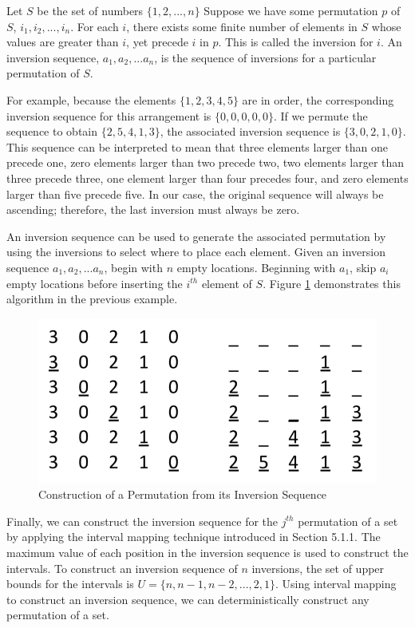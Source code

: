 Let $S$ be the set of numbers $\{1, 2, ..., n\}$ Suppose we have some permutation $p$ of $S$, $i_1, i_2, ..., i_n$. For each $i$, there exists some finite number of elements in $S$ whose values are greater than $i$, yet precede $i$ in $p$. This is called the inversion for $i$. An inversion sequence, $a_1, a_2, ... a_n$, is the sequence of inversions for a particular permutation of $S$.

For example, because the elements $\{1, 2, 3, 4, 5\}$ are in order, the corresponding inversion sequence for this arrangement is $\{0, 0, 0, 0, 0\}$. If we permute the sequence to obtain $\{2, 5, 4, 1, 3\}$, the associated inversion sequence is $\{3, 0, 2, 1, 0\}$. This sequence can be interpreted to mean that three elements larger than one precede one, zero elements larger than two precede two, two elements larger than three precede three, one element larger than four precedes four, and zero elements larger than five precede five. In our case, the original sequence will always be ascending; therefore, the last inversion must always be zero.

An inversion sequence can be used to generate the associated permutation by using the inversions to select where to place each element. Given an inversion sequence $a_1, a_2, ... a_n$, begin with $n$ empty locations. Beginning with $a_1$, skip $a_i$ empty locations before inserting the $i^{th}$ element of $S$. Figure \ref{fig:inversion_sequence} demonstrates this algorithm in the previous example.

\begin{figure}[b]
\centering
\centerline{\includegraphics[origin=c,width=12cm]{../figures/inversion-sequence.png}}
\caption{Construction of a Permutation from its Inversion Sequence}
\label{fig:inversion_sequence}
\end{figure}

Finally, we can construct the inversion sequence for the $j^{th}$ permutation of a set by applying the interval mapping technique introduced in Section 5.1.1. The maximum value of each position in the inversion sequence is used to construct the intervals. To construct an inversion sequence of $n$ inversions, the set of upper bounds for the intervals is $U = \{n, n - 1, n - 2, ..., 2, 1\}$. Using interval mapping to construct an inversion sequence, we can deterministically construct any permutation of a set.

